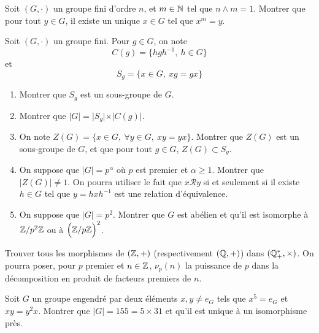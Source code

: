 \begin{exercise}
	Soit $(G,\cdot)$ un groupe fini d'ordre $n$, et $m\in\mathbb{N}$ tel que $n\wedge
	m=1$. Montrer que pour tout $y\in G$, il existe un unique $x\in G$ tel que
	$x^m=y$.
\end{exercise}

\begin{exercise}
	Soit $(G,\cdot)$ un groupe fini. Pour $g\in G$, on note 
	$$C(g)=\{hgh^{-1},~h\in G\}$$ et 
	$$S_{g}=\{x\in G,~xg=gx\}$$
	\begin{enumerate}
		\item
		Montrer que $S_{g}$ est un sous-groupe de $G$.
		\item
		Montrer que $\vert G\vert=\vert S_{g}\vert\times\vert C(g)\vert$.
		\item
		On note $Z(G)=\{x\in G,~\forall y\in G,~xy=yx\}$. Montrer que $Z(G)$ est
		un sous-groupe de $G$, et que pour tout $g\in G$, $Z(G)\subset S_{g}$.
		\item
		On suppose que $\vert G\vert=p^{\alpha}$ où $p$ est premier et
		$\alpha\geqslant1$. Montrer que $\vert Z(G)\vert\neq1$. On pourra utiliser
		le fait que $x\mathcal{R}y$ si et seulement si il existe $h\in G$ tel que
		$y=hxh^{-1}$ est une relation d'équivalence.
		\item
		On suppose que $\vert G\vert=p^{2}$. Montrer que $G$ est abélien et qu'il
		est isomorphe à $\mathbb{Z}/p^2\mathbb{Z}$ ou à $\Bigl(\mathbb{Z}/p\mathbb{Z}\Bigr)^2$.
	\end{enumerate}
\end{exercise}

\begin{exercise}
	Trouver tous les morphismes de $(\mathbb{Z},+)$ (respectivement $(\mathbb{Q},+)$) dans
	$(\mathbb{Q}_{+}^*,\times)$. On pourra poser, pour $p$ premier et $n\in\mathbb{Z}$,
	$\nu_{p}(n)$ la puissance de $p$ dans la décomposition en produit de facteurs
	premiers de $n$.
\end{exercise}

\begin{exercise}
	Soit $G$ un groupe engendré par deux éléments $x,y\neq e_{G}$ tels que
	$x^5=e_{G}$ et $xy=y^2x$. Montrer que $\vert G\vert=155=5\times31$ et qu'il
	est unique à un isomorphisme près.
\end{exercise}

